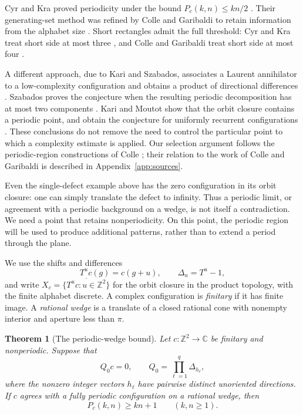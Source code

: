\documentclass[11pt]{article}
\numberwithin{equation}{section}
\newtheorem{theorem}{Theorem}[section]
\theoremstyle{definition}
\theoremstyle{remark}
\newcommand{\Z}{\mathbb Z}
\newcommand{\C}{\mathbb C}
\newcommand{\Del}[1]{\Delta_{#1}}
\begin{document}
Cyr and Kra proved periodicity under the bound $P_c(k,n)\le kn/2$
\cite[Theorem~1.2]{CK}. Their generating-set method was refined by Colle and Garibaldi to retain
information from the alphabet size \cite[Theorem~2.2]{CG}. Short rectangles admit the full
threshold: Cyr and Kra treat short side at most three \cite[Theorem~1.1]{CKshort}, and Colle and
Garibaldi treat short side at most four \cite[Theorem~1.3]{CG26}.

A different approach, due to Kari and Szabados, associates a Laurent annihilator to a low-complexity
configuration and obtains a product of directional differences \cite[Lemma~5 and Corollary~13]{KS}.
Szabados proves the conjecture when the resulting periodic decomposition has at most two components
\cite{Sz}. Kari and Moutot show that the orbit closure contains a periodic point, and
obtain the conjecture for uniformly recurrent configurations \cite[Theorem~5 and Corollary~8]{KM}.
These conclusions do not remove the need to control the particular point to which a complexity
estimate is applied. Our selection argument follows the periodic-region constructions of
Colle \cite[Sections~3--4]{Colle}; their relation to the work of Colle and Garibaldi is described in Appendix~\ref{app:sources}.

Even the single-defect example above has the zero configuration in its orbit closure: one can simply
translate the defect to infinity. Thus a periodic limit, or agreement with a periodic background on
a wedge, is not itself a contradiction. We need a point that retains nonperiodicity. On this point,
the periodic region will be used to produce additional patterns, rather than to extend a period
through the plane.

We use the shifts and differences
\[
 T^u c(g)=c(g+u),\qquad \Del u=T^u-1,
\]
and write $X_c=\overline{\{T^u c:u\in\Z^2\}}$ for the orbit closure in the product topology, with
the finite alphabet discrete. A complex configuration is \emph{finitary} if it has finite image. A
\emph{rational wedge} is a translate of a closed rational cone with nonempty interior and aperture
less than $\pi$.

\begin{theorem}[The periodic-wedge bound]\label{thm:wedge}
Let $c:\Z^2\to\C$ be finitary and nonperiodic. Suppose that
\[
 Q_0c=0,\qquad Q_0=\prod_{\ell=1}^q\Del{h_\ell},
\]
where the nonzero integer vectors $h_\ell$ have pairwise distinct unoriented directions. If $c$
agrees with a fully periodic configuration on a rational wedge, then
\[
 P_c(k,n)\ge kn+1\qquad(k,n\ge1).
\]
\end{theorem}
\end{document}
